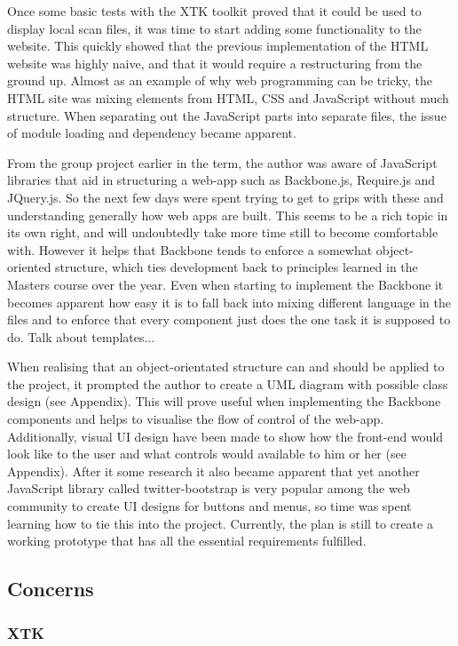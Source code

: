 \documentclass[a4paper,11pt,titlepage]{article}
\begin{document}
Once some basic tests with the XTK toolkit proved that it could be used to display local scan files, it was time to start adding some functionality to the website. This quickly showed that the previous implementation of the HTML website was highly naive, and that it would require a restructuring from the ground up. Almost as an example of why web programming can be tricky, the HTML site was mixing elements from HTML, CSS and JavaScript without much structure. When separating out the JavaScript parts into separate files, the issue of module loading and dependency became apparent.

From the group project earlier in the term, the author was aware of JavaScript libraries that aid in structuring a web-app such as Backbone.js, Require.js and JQuery.js. So the next few days were spent trying to get to grips with these and understanding generally how web apps are built. This seems to be a rich topic in its own right, and will undoubtedly take more time still to become comfortable with. However it helps that Backbone tends to enforce a somewhat object-oriented structure, which ties development back to principles learned in the Masters course over the year. Even when starting to implement the Backbone it becomes apparent how easy it is to fall back into mixing different language in the files and to enforce that every component just does the one task it is supposed to do. Talk about templates...

When realising that an object-orientated structure can and should be applied to the project, it prompted the author to create a UML diagram with possible class design (see Appendix). This will prove useful when implementing the Backbone components and helps to visualise the flow of control of the web-app. Additionally, visual UI design have been made to show how the front-end would look like to the user and what controls would available to him or her (see Appendix). After it some research it also became apparent that yet another JavaScript library called twitter-bootstrap is very popular among the web community to create UI designs for buttons and menus, so time was spent learning how to tie this into the project.
Currently, the plan is still to create a working prototype that has all the essential requirements fulfilled.


\subsection{Concerns}

\subsubsection{XTK}
\end{document}
